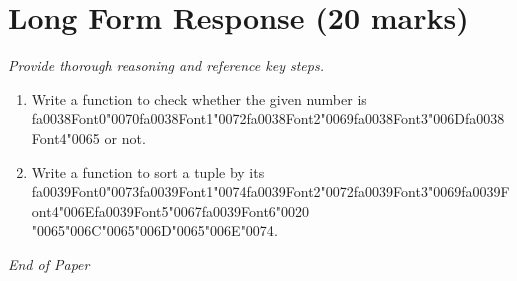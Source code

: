 \documentclass[12pt]{article}
\begin{document}
\section*{Long Form Response (20 marks)}
\textit{Provide thorough reasoning and reference key steps.}
\begin{enumerate}[label=\arabic*.]
\item Write a function to check whether the given number is {\csname fa0038Font0\endcsname\char"0070}{\csname fa0038Font1\endcsname\char"0072}{\csname fa0038Font2\endcsname\char"0069}{\csname fa0038Font3\endcsname\char"006D}{\csname fa0038Font4\endcsname\char"0065} or not.
\item Write a function to sort a tuple by its {\csname fa0039Font0\endcsname\char"0073}{\csname fa0039Font1\endcsname\char"0074}{\csname fa0039Font2\endcsname\char"0072}{\csname fa0039Font3\endcsname\char"0069}{\csname fa0039Font4\endcsname\char"006E}{\csname fa0039Font5\endcsname\char"0067}{\csname fa0039Font6\endcsname\char"0020} {\char"0065}{\char"006C}{\char"0065}{\char"006D}{\char"0065}{\char"006E}{\char"0074}.
\end{enumerate}

\vfill
\noindent\textit{End of Paper}
\end{document}
